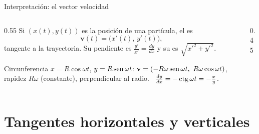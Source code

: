 \documentclass[10pt,aspectratio=169]{beamer}
\begin{document}
\begin{frame}{Interpretación: el vector velocidad}
  \begin{columns}
    \begin{column}{0.55\textwidth}
      Si $(x(t),y(t))$ es la posición de una partícula, el  es
      \[ \mathbf v(t)=\big(x'(t),\,y'(t)\big), \]
      tangente a la trayectoria. Su pendiente es $\frac{y'}{x'}=\frac{dy}{dx}$ y su  es $\sqrt{x'^2+y'^2}$.
      \begin{ejemplo}[7]
        Circunferencia $x=R\cos\omega t$, $y=R\operatorname{sen}\omega t$:
        $\mathbf v=(-R\omega\operatorname{sen}\omega t,\ R\omega\cos\omega t)$, rapidez $R\omega$ (constante), perpendicular al radio.
        \ $\frac{dy}{dx}=-\operatorname{ctg}\omega t=-\frac xy$.
      \end{ejemplo}
    \end{column}
    \begin{column}{0.45\textwidth}
      \centering
    \end{column}
  \end{columns}
\end{frame}

\section{Tangentes horizontales y verticales}
\end{document}
